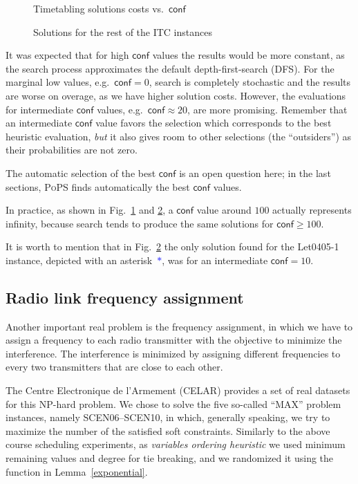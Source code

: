\documentclass{ws-ijait}
\begin{document}
\begin{figure}
  \centering
  
  \caption{Timetabling solutions costs vs.\ 
           $\mathsf{conf}$\label{costsA}}
\end{figure}

\begin{figure}
  \centering
  
  \caption{Solutions for the rest of the ITC
           instances\label{costsB}}
\end{figure}

It was expected that for high $\mathsf{conf}$ values the
results would be more constant, as the search process
approximates the default depth-first-search (DFS). For the
marginal low values, e.g.\ $\mathsf{conf} = 0$, search is
completely stochastic and the results are worse on overage,
as we have higher solution costs. However, the evaluations
for intermediate $\mathsf{conf}$ values, e.g.\ 
$\mathsf{conf} \approx 20$, are more promising. Remember
that an intermediate $\mathsf{conf}$ value favors the
selection which corresponds to the best heuristic
evaluation, \emph{but} it also gives room to other
selections (the ``outsiders'') as their probabilities are
not zero.

The automatic selection of the best $\mathsf{conf}$ is an
open question here; in the last sections, \textsc{PoPS}
finds automatically the best $\mathsf{conf}$ values.

In practice, as shown in Fig.\ \ref{costsA} and
\ref{costsB}, a $\mathsf{conf}$ value around $100$ actually
represents infinity, because search tends to produce the
same solutions for $\mathsf{conf} \geq 100$.

It is worth to mention that in Fig.~\ref{costsB} the only
solution found for the \textsf{Let0405-1} instance, depicted
with an asterisk~\textcolor{blue}{$*$}, was for an
intermediate $\mathsf{conf} = 10$.

\subsection{Radio link frequency assignment}

Another important real problem is the frequency assignment,
in which we have to assign a frequency to each radio
transmitter with the objective to minimize the interference.
The interference is minimized by assigning different
frequencies to every two transmitters that are close to each
other.

The Centre Electronique de l'Armement (CELAR) provides a set
of real datasets for this NP-hard problem.\cite{Cabon1999}
We chose to solve the five so-called ``MAX'' problem
instances, namely \textsf{SCEN06}--\textsf{SCEN10}, in
which, generally speaking, we try to maximize the number of
the satisfied soft constraints. Similarly to the above
course scheduling experiments, as \emph{variables ordering
heuristic} we used minimum remaining values and degree for
tie breaking, and we randomized it using the function in
Lemma~\ref{exponential}.
\end{document}
